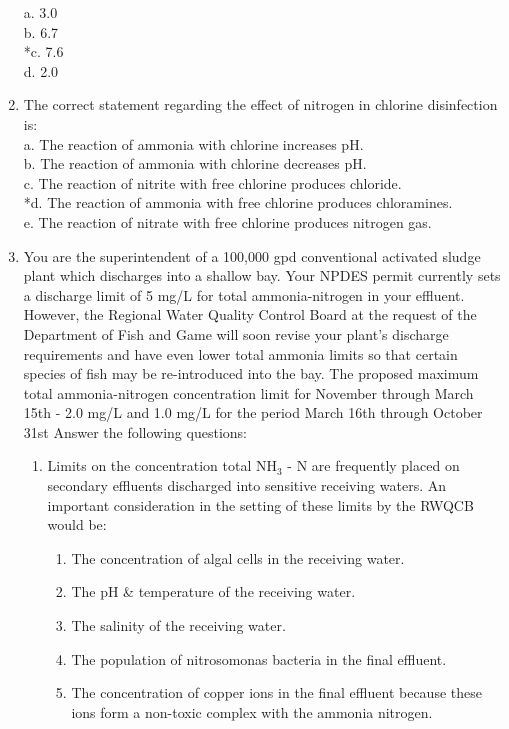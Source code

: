 \begin{enumerate}
a. 3.0 \\
b. 6.7 \\
*c. 7.6 \\
d. 2.0 

\newpage
\item  The correct statement regarding the effect of nitrogen in chlorine disinfection is: \\

a. The reaction of ammonia with chlorine increases pH. \\
b. The reaction of ammonia with chlorine decreases pH. \\
c. The reaction of nitrite with free chlorine produces chloride. \\
*d. The reaction of ammonia with free chlorine produces chloramines. \\
e. The reaction of nitrate with free chlorine produces nitrogen gas. 

\item You are the superintendent of a 100,000 gpd conventional activated sludge plant which discharges into a shallow bay.  Your NPDES permit currently sets a discharge limit of 5 mg/L for total ammonia-nitrogen in your effluent. However, the Regional Water Quality Control Board at the request of the Department of Fish and Game will soon revise your plant’s discharge requirements and have even lower total ammonia limits so that certain species of fish may be re-introduced into the bay. The proposed maximum total ammonia-nitrogen concentration limit for  November through March 15th - 2.0 mg/L and 1.0	mg/L for the period March 16th through October 31st Answer the following questions:


\begin{enumerate}[1.]
\item Limits on the concentration total NH$_3$ - N are frequently placed on secondary effluents discharged into sensitive receiving waters.  An important consideration in the setting of these limits by the RWQCB would be:
\begin{enumerate}[a]
\item The concentration of algal cells in the receiving water.
\item The pH \& temperature of the receiving water.
\item The salinity of the receiving water.
\item The population of nitrosomonas bacteria in the final effluent.
\item The concentration of copper ions in the final effluent because these ions form a non-toxic complex with the ammonia nitrogen.
\end{enumerate}




\end{enumerate}
\end{enumerate}
